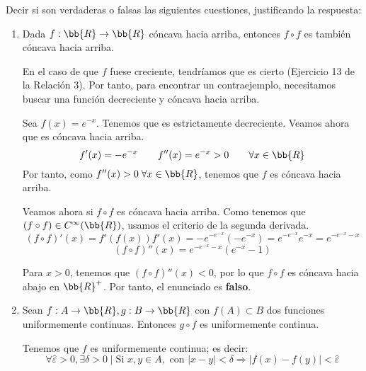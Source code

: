 \documentclass[12pt]{article}
\begin{document}
\begin{ejercicio} 
    Decir si son verdaderas o falsas las siguientes cuestiones, justificando la respuesta:

    \begin{enumerate}
        \item Dada $f:\bb{R}\to \bb{R}$ cóncava hacia arriba, entonces $f\circ f$ es también cóncava hacia arriba.

        En el caso de que $f$ fuese creciente, tendríamos que es cierto (Ejercicio 13 de la Relación 3). Por tanto, para encontrar un contraejemplo, necesitamos buscar una función decreciente y cóncava hacia arriba.

        Sea $f(x)=e^{-x}$. Tenemos que es estrictamente decreciente. Veamos ahora que es cóncava hacia arriba.
        \begin{equation*}
            f'(x)=-e^{-x} \qquad f''(x)=e^{-x}>0\qquad \forall x\in \bb{R}
        \end{equation*}
        Por tanto, como $f''(x)>0\; \forall x\in \bb{R}$, tenemos que $f$ es cóncava hacia arriba.

        Veamos ahora si $f\circ f$ es cóncava hacia arriba. Como tenemos que $(f\circ f)\in C^\infty(\bb{R})$, usamos el criterio de la segunda derivada.
        \begin{equation*}
            (f\circ f)'(x)=f'(f(x))f'(x) = -e^{-e^{-x}}(-e^{-x}) = e^{-e^{-x}}e^{-x} = e^{-e^{-x}-x}
        \end{equation*}
        \begin{equation*}
            (f\circ f)''(x)=e^{-e^{-x}-x} (e^{-x}-1)
        \end{equation*}

        Para $x>0$, tenemos que $(f\circ f)''(x)<0$, por lo que $f\circ f$ es cóncava hacia abajo en $\bb{R}^+$. Por tanto, el enunciado es \textbf{falso}.
        
    
        \item Sean $f:A\to \bb{R},g:B\to \bb{R}$ con $f(A)\subset B$ dos funciones uniformemente continuas. Entonces $g\circ f$ es uniformemente continua.

        Tenemos que $f$ es uniformemente continua; es decir:
        \begin{equation*}
            \forall \hat{\varepsilon} > 0, \exists \delta>0 \mid \text{Si } x,y\in A, \text{ con } |x-y|<\delta \Longrightarrow |f(x)-f(y)|<\hat{\varepsilon}
        \end{equation*}


\end{enumerate}
\end{ejercicio}
\end{document}
